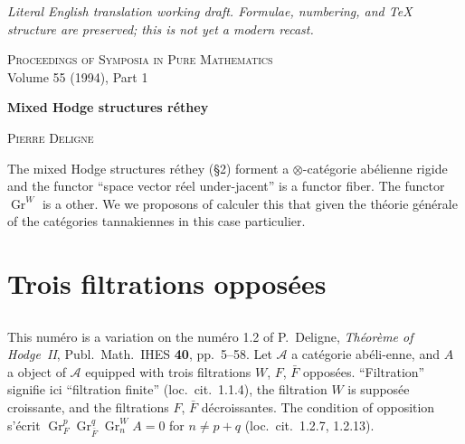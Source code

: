 \documentclass[12pt,a4paper]{article}
\theoremstyle{plain}
\theoremstyle{definition}
\DeclareMathOperator{\Gr}{Gr}
\newcommand{\A}{\mathcal{A}}
\begin{document}
\begin{center}\small\emph{Literal English translation working draft. Formulae, numbering, and TeX structure are preserved; this is not yet a modern recast.}\end{center}
\vspace{0.5em}


\begin{center}
\small\textsc{Proceedings of Symposia in Pure Mathematics}\\
\small Volume 55 (1994), Part 1
\end{center}

\vspace{1cm}

\begin{center}
\Large\textbf{Mixed Hodge structures r\'{e}they}
\end{center}

\begin{flushright}
\textsc{Pierre Deligne}
\end{flushright}

\vspace{0.5cm}

The mixed Hodge structures r\'{e}they (\S2) forment a $\otimes$-cat\'{e}gorie ab\'{e}lienne
rigide and the functor ``space vector r\'{e}el under-jacent'' is a functor
fiber. The functor $\Gr^W$ is a other. We we proposons of calculer this that
given the th\'{e}orie g\'{e}n\'{e}rale of the cat\'{e}gories tannakiennes in this case particulier.

\section{Trois filtrations oppos\'{e}es}

\subsection{}

This num\'{e}ro is a variation on the num\'{e}ro 1.2 of P.~Deligne, \textit{Th\'{e}or\`{e}me
of Hodge~II}, Publ.~Math.~IHES \textbf{40}, pp.~5--58. Let $\A$ a cat\'{e}gorie ab\'{e}li-\-enne,
and $A$ a object of $\A$ equipped with trois filtrations $W$, $F$, $\bar{F}$ oppos\'{e}es.
``Filtration'' signifie ici ``filtration finite'' (loc.~cit.~1.1.4), the filtration $W$ is
suppos\'{e}e croissante, and the filtrations $F$, $\bar{F}$ d\'{e}croissantes. The condition
of opposition s'\'{e}crit $\Gr_F^p \Gr_{\bar{F}}^q \Gr_n^W A = 0$ for $n \neq p+q$
(loc.~cit.~1.2.7, 1.2.13).
\end{document}
